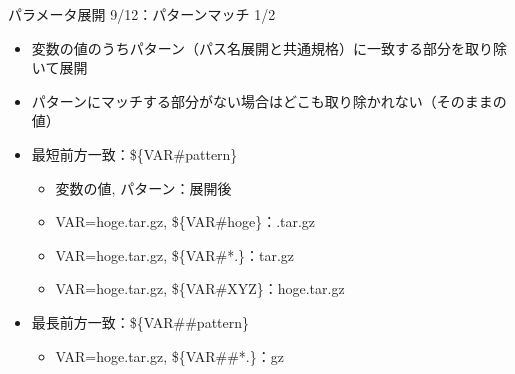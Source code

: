 \documentclass[12pt,aspectratio=169]{beamer}
\begin{document}
\begin{frame}{パラメータ展開 9/12：パターンマッチ 1/2}

  \begin{itemize}
    \item 変数の値のうちパターン（パス名展開と共通規格）に一致する部分を取り除いて展開
    \item パターンにマッチする部分がない場合はどこも取り除かれない（そのままの値）
    \item 最短前方一致：\$\{VAR\#pattern\}
      \begin{itemize}
        \item 変数の値, パターン：展開後
        \item VAR=hoge.tar.gz, \$\{VAR\#hoge\}：.tar.gz
        \item VAR=hoge.tar.gz, \$\{VAR\#*.\}：tar.gz
        \item VAR=hoge.tar.gz, \$\{VAR\#XYZ\}：hoge.tar.gz
      \end{itemize}
    \item 最長前方一致：\$\{VAR\#\#pattern\}
      \begin{itemize}
        \item VAR=hoge.tar.gz, \$\{VAR\#\#*.\}：gz
      \end{itemize}

  \end{itemize}

\end{frame}
\end{document}
